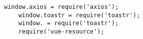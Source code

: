 \begin{lstlisting}[style=htmlcssjs]
	window.axios = require('axios');
	window.toastr = require('toastr');
	window. = require('toastr');
	require('vue-resource');
\end{lstlisting}